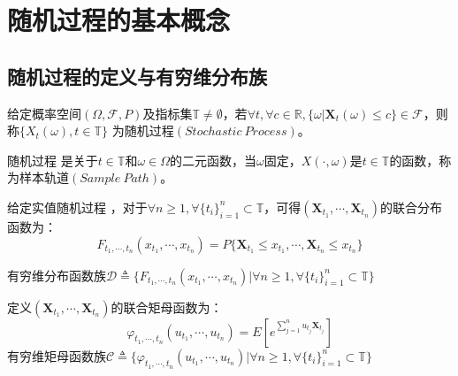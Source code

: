\section{随机过程的基本概念}
    \subsection{随机过程的定义与有穷维分布族} 
        \begin{definition}[随机过程]

            给定概率空间$(\Omega, \mathscr{F}, P)$及指标集$\mathbb{T} \neq  \emptyset $，若$\forall t, \forall c \in \mathbb{R}, \{\omega | \textbf{X}_t(\omega) \leq c\} \in \mathscr{F}$，则称$\{X_t(\omega), t \in \mathbb{T}\}$ 为随机过程$(Stochastic\ Process)$。

        \end{definition}

        \begin{definition}[样本轨道]
            
            随机过程 \StochasticProcess 是关于$t \in \mathbb{T}$和$\omega \in \Omega$的二元函数，当$\omega$固定，$X(\cdot, \omega)$是$t \in \mathbb{T}$的函数，称为样本轨道$(Sample\ Path)$。

        \end{definition}

        \begin{definition}[有穷维分布族]

            给定实值随机过程 \StochasticProcess ，对于$\forall n \geq 1, \forall {\{t_i\}}_{i=1}^{n} \subset \mathbb{T} $，可得$(\textbf{X}_{t_1}, \cdots, \textbf{X}_{t_n})$的联合分布函数为：
            $$
            F_{t_1, \cdots, t_n}(x_{t_1}, \cdots, x_{t_n}) = P\{\textbf{X}_{t_1} \leq x_{t_1}, \cdots, \textbf{X}_{t_n} \leq x_{t_n}\}
            $$

            \noindent
            有穷维分布函数族$\mathscr{D} \triangleq \{F_{t_1, \cdots, t_n}(x_{t_1}, \cdots, x_{t_n})| \forall n \geq 1, \forall \{t_i\}_{i=1}^{n} \subset \mathbb{T}\}$
            
            \noindent
            定义$(\textbf{X}_{t_1}, \cdots, \textbf{X}_{t_n})$的联合矩母函数为：
            $$
            \varphi_{t_1, \cdots, t_n}(u_{t_1}, \cdots, u_{t_n}) = E\left[e^{\sum_{j=1}^{n} u_{t_j} \textbf{X}_{t_j}}\right]
            $$
            有穷维矩母函数族$\mathscr{C} \triangleq \{\varphi_{t_1, \cdots, t_n}(u_{t_1}, \cdots, u_{t_n}) | \forall n \geq 1, \forall \{t_i\}_{i=1}^{n} \subset \mathbb{T}\}$

        \end{definition}


